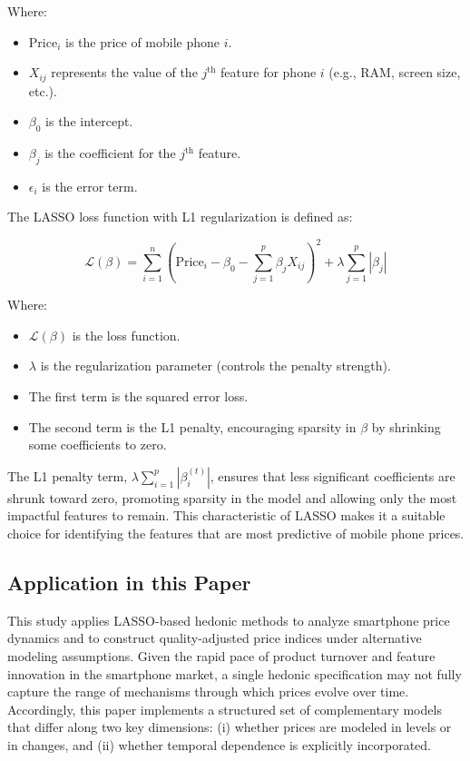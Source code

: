 \documentclass[12pt]{article}
\begin{document}
Where:
\begin{itemize}
    \item $\text{Price}_i$ is the price of mobile phone $i$.
    \item $X_{ij}$ represents the value of the $j^{\text{th}}$ feature for phone $i$ (e.g., RAM, screen size, etc.).
    \item $\beta_0$ is the intercept.
    \item $\beta_j$ is the coefficient for the $j^{\text{th}}$ feature.
    \item $\epsilon_i$ is the error term.
\end{itemize}

\noindent The LASSO loss function with L1 regularization is defined as:

\begin{equation}
\mathcal{L}(\beta) = \sum_{i=1}^n \left(\text{Price}_i - \beta_0 - \sum_{j=1}^p \beta_j X_{ij} \right)^2 + \lambda \sum_{j=1}^p |\beta_j|
\end{equation}

Where:
\begin{itemize}
    \item $\mathcal{L}(\beta)$ is the loss function.
    \item $\lambda$ is the regularization parameter (controls the penalty strength).
    \item The first term is the squared error loss.
    \item The second term is the L1 penalty, encouraging sparsity in $\beta$ by shrinking some coefficients to zero.
\end{itemize}

\noindent
The L1 penalty term, $\lambda \sum_{i=1}^p |\beta_i^{(t)}|$, ensures that less significant coefficients are shrunk toward zero, promoting sparsity in the model and allowing only the most impactful features to remain. This characteristic of LASSO makes it a suitable choice for identifying the features that are most predictive of mobile phone prices.



\subsection{Application in this Paper}

This study applies LASSO-based hedonic methods to analyze smartphone price dynamics and to construct quality-adjusted price indices under alternative modeling assumptions. Given the rapid pace of product turnover and feature innovation in the smartphone market, a single hedonic specification may not fully capture the range of mechanisms through which prices evolve over time. Accordingly, this paper implements a structured set of complementary models that differ along two key dimensions: (i) whether prices are modeled in levels or in changes, and (ii) whether temporal dependence is explicitly incorporated.
\end{document}
